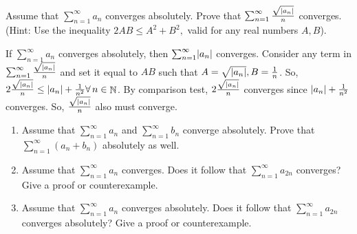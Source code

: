 \documentclass[12pt,letterpaper,boxed]{hmcpset}
\DeclareMathOperator{\N}{\mathbb{N}}
\DeclarePairedDelimiter\abs{\lvert}{\rvert}%
\begin{document}
\begin{solution}

\end{solution}


\begin{problem}[Exercise 3.6]
Assume that $\sum_{n = 1}^{\infty} a_n$ converges absolutely. Prove that $\sum_{n =1}^{\infty} \frac{\sqrt{\abs{a_n}}}{n}$ converges. (Hint: Use the inequality $2AB \leq A^{2} + B^{2},$ valid for any real numbers $A, B$).
\end{problem}


\begin{solution}
If $\sum_{n = 1}^{\infty} a_n$ converges absolutely, then $\sum_{n = 1}^{\infty} \abs{a_n}$ converges. Consider any term in $\sum_{n =1}^{\infty} \frac{\sqrt{\abs{a_n}}}{n}$ and set it equal to $AB$ such that $A = \sqrt{\abs{a_n}}, B = \frac{1}{n}$. So, $2\frac{\sqrt{\abs{a_n}}}{n} \leq \abs{a_n} + \frac{1}{n^{2}} \forall\,n\in\N$. By comparison test, $2\frac{\sqrt{\abs{a_n}}}{n}$ converges since $\abs{a_n} + \frac{1}{n^{2}}$ converges. So, $\frac{\sqrt{\abs{a_n}}}{n}$ also must converge.
\end{solution}


\begin{problem}[Exercise 3.7]
\begin{enumerate}
    \item Assume that $\sum_{n = 1}^{\infty} a_n$ and $\sum_{n = 1}^{\infty} b_n$ converge absolutely. Prove that $\sum_{n = 1}^{\infty} (a_n + b_n)$ absolutely as well.
    \item Assume that $\sum_{n = 1}^{\infty} a_n$ converges. Does it follow that $\sum_{n = 1}^{\infty} a_{2n}$ converges? Give a proof or counterexample.
    \item Assume that $\sum_{n = 1}^{\infty} a_n$ converges absolutely. Does it follow that $\sum_{n = 1}^{\infty} a_{2n}$ converges absolutely? Give a proof or counterexample.
\end{enumerate}
\end{problem}
\end{document}
